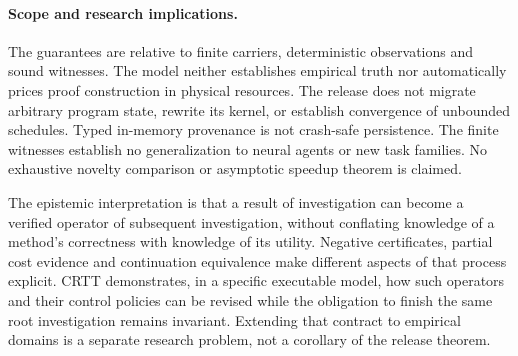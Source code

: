 \paragraph{Scope and research implications.}
The guarantees are relative to finite carriers, deterministic observations and sound witnesses. The model neither establishes empirical truth nor automatically prices proof construction in physical resources. The release does not migrate arbitrary program state, rewrite its kernel, or establish convergence of unbounded schedules. Typed in-memory provenance is not crash-safe persistence. The finite witnesses establish no generalization to neural agents or new task families. No exhaustive novelty comparison or asymptotic speedup theorem is claimed.

The epistemic interpretation is that a result of investigation can become a verified operator of subsequent investigation, without conflating knowledge of a method's correctness with knowledge of its utility. Negative certificates, partial cost evidence and continuation equivalence make different aspects of that process explicit. CRTT demonstrates, in a specific executable model, how such operators and their control policies can be revised while the obligation to finish the same root investigation remains invariant. Extending that contract to empirical domains is a separate research problem, not a corollary of the release theorem.
